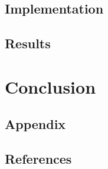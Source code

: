 \section{Implementation}
\section{Results}
\chapter{Conclusion}
\section{Appendix}

\section{References}
